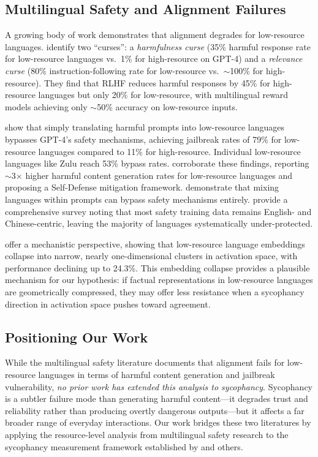 \subsection{Multilingual Safety and Alignment Failures}

A growing body of work demonstrates that alignment degrades for low-resource languages. \citet{shen2024language} identify two ``curses'': a \emph{harmfulness curse} (35\% harmful response rate for low-resource languages vs.\ 1\% for high-resource on GPT-4) and a \emph{relevance curse} (80\% instruction-following rate for low-resource vs.\ ${\sim}$100\% for high-resource). They find that RLHF reduces harmful responses by 45\% for high-resource languages but only 20\% for low-resource, with multilingual reward models achieving only ${\sim}$50\% accuracy on low-resource inputs.

\citet{yong2023low} show that simply translating harmful prompts into low-resource languages bypasses GPT-4's safety mechanisms, achieving jailbreak rates of 79\% for low-resource languages compared to 11\% for high-resource. Individual low-resource languages like Zulu reach 53\% bypass rates. \citet{deng2023multilingual} corroborate these findings, reporting ${\sim}$3$\times$ higher harmful content generation rates for low-resource languages and proposing a Self-Defense mitigation framework. \citet{song2024multilingual} demonstrate that mixing languages within prompts can bypass safety mechanisms entirely. \citet{yong2025survey} provide a comprehensive survey noting that most safety training data remains English- and Chinese-centric, leaving the majority of languages systematically under-protected.

\citet{li2024language} offer a mechanistic perspective, showing that low-resource language embeddings collapse into narrow, nearly one-dimensional clusters in activation space, with performance declining up to 24.3\%. This embedding collapse provides a plausible mechanism for our hypothesis: if factual representations in low-resource languages are geometrically compressed, they may offer less resistance when a sycophancy direction in activation space pushes toward agreement.

\subsection{Positioning Our Work}

While the multilingual safety literature documents that alignment fails for low-resource languages in terms of harmful content generation and jailbreak vulnerability, \emph{no prior work has extended this analysis to sycophancy}. Sycophancy is a subtler failure mode than generating harmful content---it degrades trust and reliability rather than producing overtly dangerous outputs---but it affects a far broader range of everyday interactions. Our work bridges these two literatures by applying the resource-level analysis from multilingual safety research to the sycophancy measurement framework established by \citet{sharma2023towards} and others.
